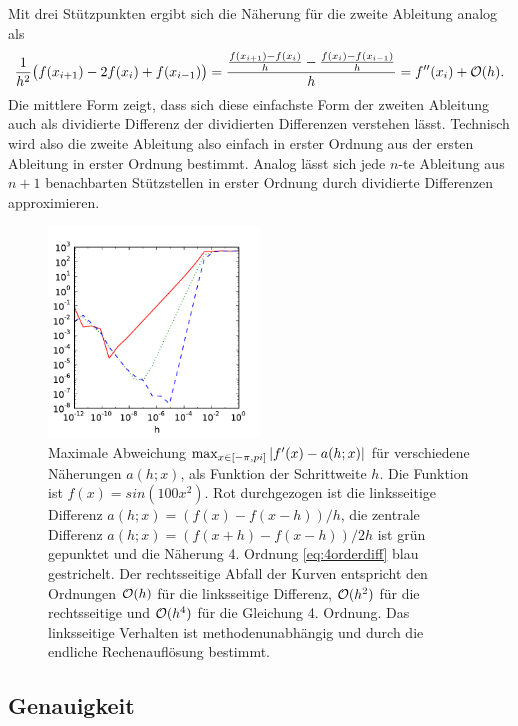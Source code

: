 Mit drei Stützpunkten ergibt sich die Näherung für die zweite
Ableitung analog als
\begin{multline}
  \label{eq:1order2diff}
  \frac{1}{h^2}\bigl(f(x_{i+1}) -
  2f(x_i)  + f(x_{i-1})\bigr) =
  \frac{\frac{f(x_{i+1}) - f(x_i)}{h}  -
    \frac{f(x_i) - f(x_{i-1})}{h}}{h}
  = f''(x_i) + \mathcal O(h).
\end{multline}
Die mittlere Form zeigt, dass sich diese einfachste Form der zweiten
Ableitung auch als dividierte Differenz der dividierten Differenzen
verstehen lässt. Technisch wird also die zweite Ableitung also einfach
in erster Ordnung aus der ersten Ableitung in erster Ordnung
bestimmt. Analog lässt sich jede $n$-te Ableitung aus $n+1$
benachbarten Stützstellen in erster Ordnung durch dividierte
Differenzen approximieren.

\begin{figure}
  \centering
  \includegraphics[width=0.5\textwidth]{plots/num_diff}
  \caption{Maximale Abweichung $\max_{x\in[-\pi,pi]} \left\lvert{f'(x) - a(h;
      x)}\right\rvert$ für verschiedene Näherungen $a(h; x)$, als Funktion der
    Schrittweite $h$. Die Funktion ist $f(x)=sin(100x^2)$. Rot
    durchgezogen ist die linksseitige Differenz $a(h; x) = (f(x) -
    f(x-h))/h$, die zentrale Differenz $a(h; x) = (f(x+h) -
    f(x-h))/2h$ ist grün gepunktet und die Näherung 4. Ordnung
    \eqref{eq:4orderdiff} blau gestrichelt. Der rechtsseitige Abfall
    der Kurven entspricht den Ordnungen $\mathcal O(h)$ für die linksseitige
    Differenz, $\mathcal O(h^2)$ für die rechtsseitige und $\mathcal O(h^4)$ für die
    Gleichung 4. Ordnung. Das linksseitige Verhalten ist
    methodenunabhängig und durch die endliche Rechenauflösung bestimmt.}
  \label{fig:num_diff}
\end{figure}

\subsection{Genauigkeit}

